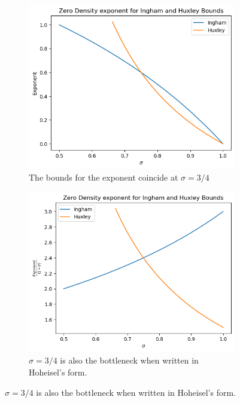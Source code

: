  \begin{figure}[h]
    \centering
    \begin{subfigure}{0.4\textwidth}
        \includegraphics[width=\textwidth]{inghamhuxley1.png}
        \caption{The bounds for the exponent coincide at $\sigma=3/4$}
    \end{subfigure}
    \begin{subfigure}{0.4\textwidth}
        \includegraphics[width=\textwidth]{inghamhuxley2.png}
        \caption{$\sigma=3/4$ is also the bottleneck when written in Hoheisel's form.}
    \end{subfigure}


\end{figure}
